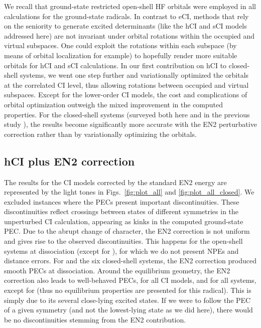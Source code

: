 \documentclass[aip,jcp,reprint,noshowkeys,superscriptaddress]{revtex4-1}
\begin{document}
We recall that ground-state restricted open-shell HF orbitals were employed in all calculations for the ground-state radicals.
In contrast to eCI, methods that rely on the seniority to generate excited determinants (like the hCI and sCI models addressed here)
are not invariant under orbital rotations within the occupied and virtual subspaces. \cite{Bytautas_2011,Limacher_2014,Stein_2014}
One could exploit the rotations within each subspace (by means of orbital localization for example) to hopefully render more suitable orbitals for hCI and sCI calculations.
In our first contribution on hCI to closed-shell systems, \cite{Kossoski_2022} we went one step further
and variationally optimized the orbitals at the correlated CI level, thus allowing rotations between occupied and virtual subspaces.
Except for the lower-order CI models, the cost and complications of orbital optimization outweigh the mixed improvement in the computed properties. \cite{Kossoski_2022}
For the closed-shell systems (surveyed both here and in the previous study \cite{Kossoski_2022}),
the results become significantly more accurate with the EN2 perturbative correction rather than by variationally optimizing the orbitals.

\subsection{hCI plus EN2 correction}
\label{sec:res_B}

The results for the CI models corrected by the standard EN2 energy are represented by the light tones in Figs.~\ref{fig:plot_all} and \ref{fig:plot_all_closed}.
We excluded instances where the PECs present important discontinuities.
These discontinuities reflect crossings between states of different symmetries in the unperturbed CI calculation,
appearing as kinks in the computed ground-state PEC.
Due to the abrupt change of character, the EN2 correction is not uniform and gives rise to the observed discontinuities.
This happens for the open-shell systems at dissociation (except for ), for which we do not present NPEs and distance errors.
For  and the six closed-shell systems, the EN2 correction produced smooth PECs at dissociation.
Around the equilibrium geometry, the EN2 correction also leads to well-behaved PECs, for all CI models, and for all systems, except for 
(thus no equilibrium properties are presented for this radical).
This is simply due to its several close-lying excited states.
If we were to follow the PEC of a given symmetry (and not the lowest-lying state as we did here), there would be no discontinuities stemming from the EN2 contribution.
\end{document}

